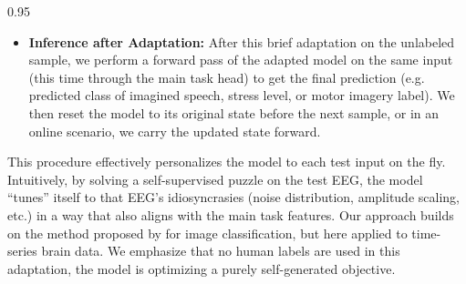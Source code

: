 \documentclass{article} %
\begin{document}
\begin{spacing}{0.95}
\begin{itemize}
    \item \textbf{Inference after Adaptation:} After this brief adaptation on the unlabeled sample, we perform a forward pass of the adapted model on the same input (this time through the main task head) to get the final prediction (e.g. predicted class of imagined speech, stress level, or motor imagery label). We then reset the model to its original state before the next sample, or in an online scenario, we carry the updated state forward.
\end{itemize}

This procedure effectively personalizes the model to each test input on the fly. Intuitively, by solving a self-supervised puzzle on the test EEG, the model “tunes” itself to that EEG’s idiosyncrasies (noise distribution, amplitude scaling, etc.) in a way that also aligns with the main task features. Our approach builds on the method proposed by \cite{sun2020test} for image classification, but here applied to time-series brain data. We emphasize that no human labels are used in this adaptation, the model is optimizing a purely self-generated objective.
\end{spacing}
\end{document}
